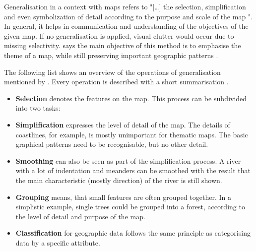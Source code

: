 Generalisation in a context with maps refers to "[\ldots] the selection, simplification and even symbolization of detail according to the purpose and scale of the map ".
In general, it helps in communication and understanding of the objectives of the given map. If no generalisation is applied, visual clutter would occur due to missing selectivity. \citeauthor{Tyner2010} says the main objective of this method is to emphasise the theme of a map, while still preserving important geographic patterns .

The following list shows an overview of the operations of generalisation mentioned by \citeauthor{Tyner2010}. Every operation is described with a short summarisation .

\begin{itemize}
\item \textbf{Selection} denotes the features on the map. This process can be subdivided into two tasks:


\item \textbf{Simplification} expresses the level of detail of the map. The details of coastlines, for example, is mostly unimportant for thematic maps. The basic graphical patterns need to be recognisable, but no other detail.

\item \textbf{Smoothing} can also be seen as part of the simplification process. A river with a lot of indentation and meanders can be smoothed with the result that the main characteristic (mostly direction) of the river is still shown.

\item \textbf{Grouping} means, that small features are often grouped together. In a simplistic example, single trees could be grouped into a forest, according to the level of detail and purpose of the map.

\item \textbf{Classification} for geographic data follows the same principle as categorising data by a specific attribute.


\end{itemize}
